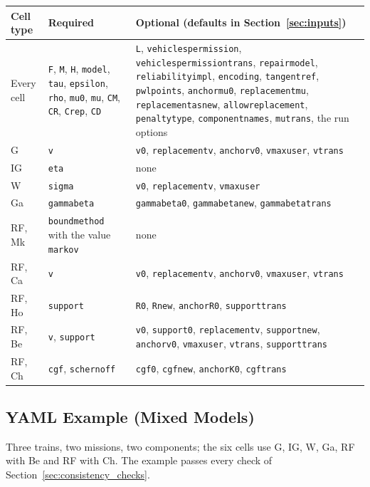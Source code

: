 \documentclass[11pt,a4paper]{article}
\makeatletter
\theoremstyle{plain}
\theoremstyle{definition}
\renewcommand{\_}{\textunderscore\allowbreak{}}
\providecommand{\typerow}[3]{{\raggedright #1\par} & {\raggedright #2\par} & {\raggedright #3\par} \\}
\providecommand{\tabstart}[2]{\begingroup\small\begin{longtable}{@{}#1@{}}\toprule #2 \\ \midrule \endhead}
\providecommand{\tabend}{\bottomrule\end{longtable}\endgroup}
\makeatother
\begin{document}
\tabstart{p{2.6cm}p{4.7cm}p{6.9cm}}{Cell type & Required & Optional (defaults in Section~\ref{sec:inputs})}
\typerow{Every cell}{\texttt{F}, \texttt{M}, \texttt{H}, \texttt{model}, \texttt{tau}, \texttt{epsilon}, \texttt{rho}, \texttt{mu\_0}, \texttt{mu}, \texttt{C\_M}, \texttt{C\_R}, \texttt{C\_rep}, \texttt{C\_D}}{\texttt{L}, \texttt{vehicles\_per\_mission}, \texttt{vehicles\_per\_mission\_trans}, \texttt{repair\_model}, \texttt{reliability\_impl}, \texttt{encoding}, \texttt{tangent\_ref}, \texttt{pwl\_points}, \texttt{anchor\_mu\_0}, \texttt{replacement\_mu}, \texttt{replacement\_as\_new}, \texttt{allow\_replacement}, \texttt{penalty\_type}, \texttt{component\_names}, \texttt{mu\_trans}, the run options}
\typerow{G}{\texttt{v}}{\texttt{v\_0}, \texttt{replacement\_v}, \texttt{anchor\_v\_0}, \texttt{v\_max\_user}, \texttt{v\_trans}}
\typerow{IG}{\texttt{eta}}{none}
\typerow{W}{\texttt{sigma}}{\texttt{v\_0}, \texttt{replacement\_v}, \texttt{v\_max\_user}}
\typerow{Ga}{\texttt{gamma\_beta}}{\texttt{gamma\_beta\_0}, \texttt{gamma\_beta\_new}, \texttt{gamma\_beta\_trans}}
\typerow{RF, Mk}{\texttt{bound\_method} with the value \texttt{markov}}{none}
\typerow{RF, Ca}{\texttt{v}}{\texttt{v\_0}, \texttt{replacement\_v}, \texttt{anchor\_v\_0}, \texttt{v\_max\_user}, \texttt{v\_trans}}
\typerow{RF, Ho}{\texttt{support}}{\texttt{R\_0}, \texttt{R\_new}, \texttt{anchor\_R\_0}, \texttt{support\_trans}}
\typerow{RF, Be}{\texttt{v}, \texttt{support}}{\texttt{v\_0}, \texttt{support\_0}, \texttt{replacement\_v}, \texttt{support\_new}, \texttt{anchor\_v\_0}, \texttt{v\_max\_user}, \texttt{v\_trans}, \texttt{support\_trans}}
\typerow{RF, Ch}{\texttt{cgf}, \texttt{s\_chernoff}}{\texttt{cgf\_0}, \texttt{cgf\_new}, \texttt{anchor\_K\_0}, \texttt{cgf\_trans}}
\tabend

\subsection{YAML Example (Mixed Models)}\label{sec:schema_example}

Three trains, two missions, two components; the six cells use G, IG, W, Ga, RF with Be and RF with Ch.
The example passes every check of Section~\ref{sec:consistency_checks}.
\end{document}
